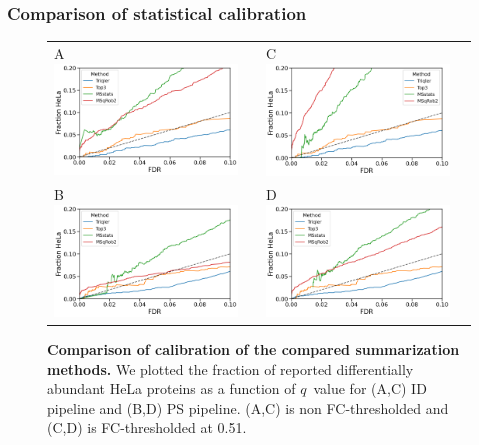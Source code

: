 \documentclass[11pt]{article}
\begin{document}
\subsubsection*{Comparison of statistical calibration}
\begin{figure}[hbt]
    \centering
    \centering
    \begin{tabular}{lclc} 
        A \includegraphics[width=0.4\linewidth]{../../result/report_plots_pipeline/calibration_ID_0.png} & &%
        C \includegraphics[width=0.4\linewidth]{../../result/report_plots_pipeline/calibration_ID_0.51.png} & \\%
        B \includegraphics[width=0.4\linewidth]{../../result/report_plots_pipeline/calibration_PS_0.png} & &%
        D \includegraphics[width=0.4\linewidth]{../../result/report_plots_pipeline/calibration_PS_0.51.png} & \\%
    \end{tabular}
  \caption{{\bf Comparison of calibration of the compared summarization methods.} We plotted the fraction of reported differentially abundant HeLa proteins as a function of $q$~value for (A,C) ID pipeline and (B,D) PS pipeline. (A,C) is non FC-thresholded and (C,D) is FC-thresholded at 0.51. \label{fig:frac_hela_vs_fdr}}
\end{figure}
\end{document}
